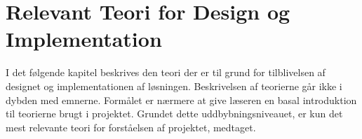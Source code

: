 \chapter{Relevant Teori for Design og Implementation}

I det følgende kapitel beskrives den teori der er til grund for tilblivelsen af designet og implementationen af løsningen. Beskrivelsen af teorierne går ikke i dybden med emnerne. Formålet er nærmere at give læseren en basal introduktion til teorierne brugt i projektet. Grundet dette uddbybningsniveauet, er kun det mest relevante teori for forståelsen af projektet, medtaget.






